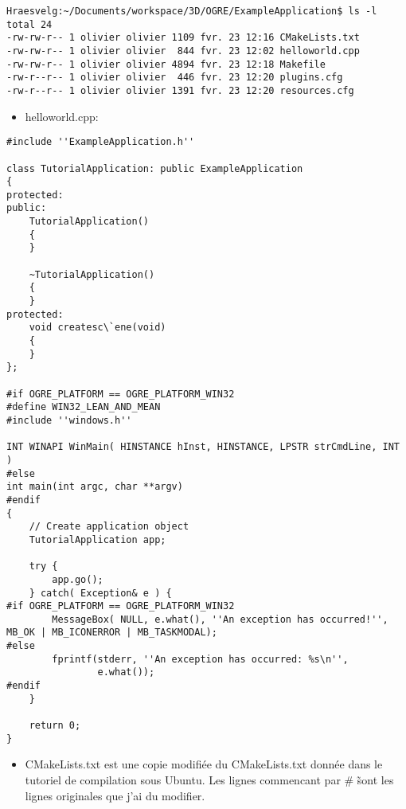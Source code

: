 \begin{lstlisting}
Hraesvelg:~/Documents/workspace/3D/OGRE/ExampleApplication$ ls -l
total 24
-rw-rw-r-- 1 olivier olivier 1109 fvr. 23 12:16 CMakeLists.txt
-rw-rw-r-- 1 olivier olivier  844 fvr. 23 12:02 helloworld.cpp
-rw-rw-r-- 1 olivier olivier 4894 fvr. 23 12:18 Makefile
-rw-r--r-- 1 olivier olivier  446 fvr. 23 12:20 plugins.cfg
-rw-r--r-- 1 olivier olivier 1391 fvr. 23 12:20 resources.cfg
\end{lstlisting}


\begin{itemize}
\item helloworld.cpp:
\end{itemize}

\begin{lstlisting}
#include ''ExampleApplication.h''
 
class TutorialApplication: public ExampleApplication
{
protected:
public:
    TutorialApplication()
    {
    }
 
    ~TutorialApplication()
    {
    }
protected:
    void createsc\`ene(void)
    {
    }
};
 
#if OGRE_PLATFORM == OGRE_PLATFORM_WIN32
#define WIN32_LEAN_AND_MEAN
#include ''windows.h''
 
INT WINAPI WinMain( HINSTANCE hInst, HINSTANCE, LPSTR strCmdLine, INT )
#else
int main(int argc, char **argv)
#endif
{
    // Create application object
    TutorialApplication app;
 
    try {
        app.go();
    } catch( Exception& e ) {
#if OGRE_PLATFORM == OGRE_PLATFORM_WIN32
        MessageBox( NULL, e.what(), ''An exception has occurred!'', MB_OK | MB_ICONERROR | MB_TASKMODAL);
#else
        fprintf(stderr, ''An exception has occurred: %s\n'',
                e.what());
#endif
    }
 
    return 0;
}
\end{lstlisting}



\begin{itemize}
\item CMakeLists.txt est une copie modifi\'ee du CMakeLists.txt donn\'ee dans le tutoriel de compilation sous Ubuntu. Les lignes commencant par \# \~ sont les lignes originales que j'ai du modifier.
\end{itemize}





